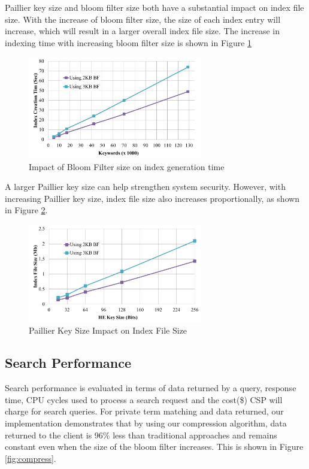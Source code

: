 Paillier key size and bloom filter size both have a substantial impact on index file size. 
With the increase of bloom filter size, the size of each
index entry will increase, which will result in a larger overall index file
size. The increase in indexing time with increasing bloom filter size 
is shown in Figure \ref{fig: bf-size-exe-time}

 \begin{figure}
  \centering
  \includegraphics[width= 3in]{figures/index_time_graph.png}
  \caption{Impact of Bloom Filter size on index generation time}
  \label{fig: bf-size-exe-time}
\end{figure}

A larger Paillier key size can help strengthen system security. However, with
increasing Paillier key size, index file size also increases proportionally,
as shown in
Figure \ref{fig: pascal-size-exe-time}.

 \begin{figure}
  \centering
  \includegraphics[width= 3in]{figures/paillier_index_size_graph.png}
  \caption{Paillier Key Size Impact on Index File Size}
  \label{fig: pascal-size-exe-time}
\end{figure}

\subsection{Search Performance}

Search performance is evaluated in terms of data returned by a query, response
time, CPU cycles used to process a search request and the cost(\$) CSP will
charge for search queries. 
For private term matching and data returned, our implementation demonstrates
that by using our compression algorithm, data returned to the client
is 96\% less than traditional approaches and remains constant even when the size of the 
bloom filter increases. This is shown in Figure \ref{fig:compress}.

